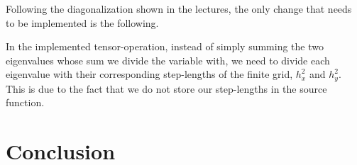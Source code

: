 \documentclass[fontsize=11pt,paper=a4,titlepage]{article}
\begin{document}
Following the diagonalization shown in the lectures, the only change that needs
to be implemented is the following.

In the implemented tensor-operation, instead of simply summing the two
eigenvalues whose sum we divide the variable with, we need to divide each
eigenvalue with their corresponding step-lengths of the finite grid, $h_x^2$ and
$h_y^2$. This is due to the fact that we do not store our step-lengths in the
source function.

\section{Conclusion}


{}

\end{document}
